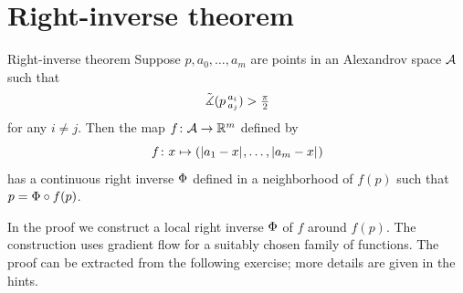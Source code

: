 \section{Right-inverse theorem}

\begin{thm}{Right-inverse theorem}\label{thm:right-inverse}
Suppose $p,a_0,\dots,a_m$ are points in an Alexandrov space $\mathcal{A}$ such that
\[\tilde\measuredangle(p\,{}^{a_i}_{a_j})>\tfrac\pi2\]
for any $i\ne j$.
Then the map $f\colon\mathcal{A}\to\mathbb{R}^m$ defined by
\[f\:x\mapsto (\dist{a_1}{x}{},\dots,\dist{a_m}{x}{})\]
has a continuous right inverse $\Phi$ defined in a neighborhood of $f(p)$ such that $p=\Phi\circ f(p)$.
\end{thm}

In the proof we construct a local right inverse $\Phi$ of $f$ around $f(p)$.
The construction uses gradient flow for a suitably chosen family of functions.
The proof can be extracted from the following exercise;
more details are given in the hints.

